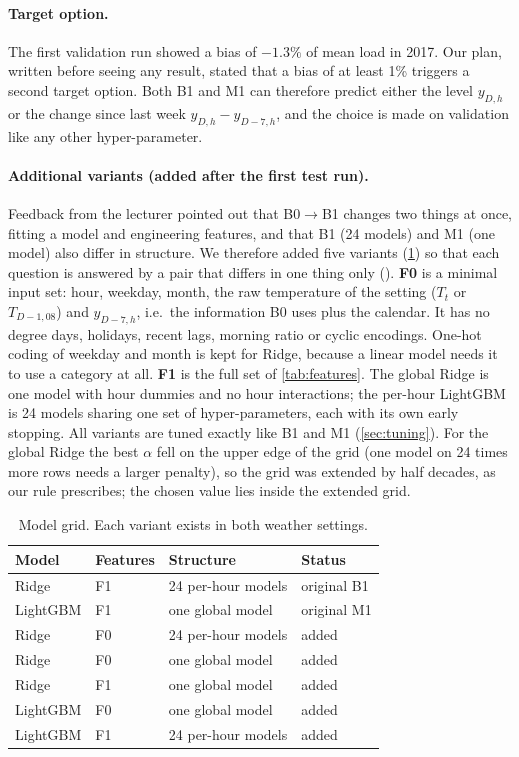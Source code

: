 \paragraph{Target option.}
The first validation run showed a bias of $-1.3\%$ of mean load in 2017. Our plan, written
before seeing any result, stated that a bias of at least 1\% triggers a second target option. Both
B1 and M1 can therefore predict either the level $y_{D,h}$ or the change since last week
$y_{D,h}-y_{D-7,h}$, and the choice is made on validation like any other hyper-parameter.

\paragraph{Additional variants (added after the first test run).}
Feedback from the lecturer pointed out that B0$\to$B1 changes two things at once, fitting a model
and engineering features, and that B1 (24 models) and M1 (one model) also differ in structure. We
therefore added five variants (\cref{tab:variants}) so that each question is answered by a pair that
differs in one thing only (). \textbf{F0} is a minimal input set: hour, weekday,
month, the raw temperature of the setting ($T_t$ or $T_{D-1,08}$) and $y_{D-7,h}$, i.e.\ the
information B0 uses plus the calendar. It has no degree days, holidays, recent lags, morning ratio or
cyclic encodings. One-hot coding of weekday and month is kept for Ridge, because a linear model needs
it to use a category at all. \textbf{F1} is the full set of \cref{tab:features}. The global Ridge is
one model with hour dummies and no hour interactions; the per-hour LightGBM is 24 models sharing one
set of hyper-parameters, each with its own early stopping. All variants are tuned exactly like B1 and
M1 (\cref{sec:tuning}). For the global Ridge the best $\alpha$ fell on the upper edge of the grid
(one model on 24 times more rows needs a larger penalty), so the grid was extended by half decades,
as our rule prescribes; the chosen value lies inside the extended grid.

\begin{table}[H]
  \centering
  \small
  \caption{Model grid. Each variant exists in both weather settings.}
  \label{tab:variants}
  \begin{tabular}{@{}l l l l@{}}
    \toprule
    Model & Features & Structure & Status \\
    \midrule
    Ridge & F1 & 24 per-hour models & original B1 \\
    LightGBM & F1 & one global model & original M1 \\
    Ridge & F0 & 24 per-hour models & added \\
    Ridge & F0 & one global model & added \\
    Ridge & F1 & one global model & added \\
    LightGBM & F0 & one global model & added \\
    LightGBM & F1 & 24 per-hour models & added \\
    \bottomrule
  \end{tabular}
\end{table}
